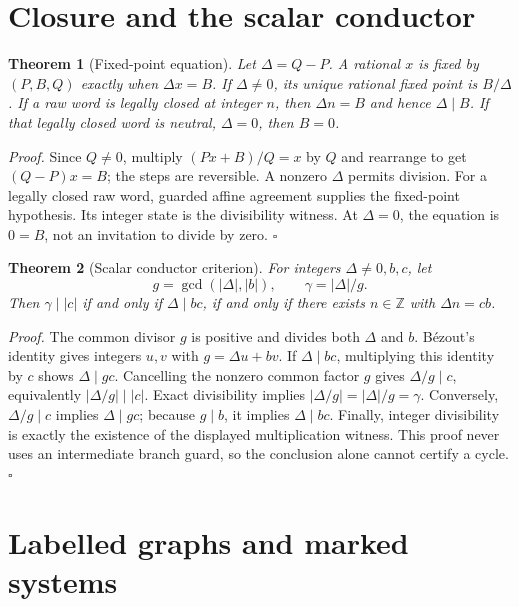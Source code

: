 \documentclass[11pt,letterpaper]{article}
\newcommand{\Z}{\mathbb{Z}}
\newtheorem{theorem}{Theorem}
\newenvironment{proof}{\noindent\textit{Proof.}}{\hfill\(\square\)}
\begin{document}
\section{Closure and the scalar conductor}

\begin{theorem}[Fixed-point equation]
Let \(\Delta=Q-P\). A rational \(x\) is fixed by \((P,B,Q)\) exactly when
\(\Delta x=B\). If \(\Delta\ne0\), its unique rational fixed point is
\(B/\Delta\). If a raw word is legally closed at integer \(n\), then
\(\Delta n=B\) and hence \(\Delta\mid B\). If that legally closed word is
neutral, \(\Delta=0\), then \(B=0\).
\end{theorem}
\begin{proof}
Since \(Q\ne0\), multiply \((Px+B)/Q=x\) by \(Q\) and rearrange to get
\((Q-P)x=B\); the steps are reversible. A nonzero \(\Delta\) permits division.
For a legally closed raw word, guarded affine agreement supplies the fixed-point
hypothesis. Its integer state is the divisibility witness. At \(\Delta=0\),
the equation is \(0=B\), not an invitation to divide by zero.
\end{proof}

\begin{theorem}[Scalar conductor criterion]
For integers \(\Delta\ne0,b,c\), let
\[
g=\gcd(|\Delta|,|b|),\qquad \gamma=|\Delta|/g.
\]
Then \(\gamma\mid |c|\) if and only if \(\Delta\mid bc\), if and only if there
exists \(n\in\Z\) with \(\Delta n=cb\).
\end{theorem}
\begin{proof}
The common divisor \(g\) is positive and divides both \(\Delta\) and \(b\).
B\'ezout's identity \cite{Lang02} gives integers \(u,v\) with \(g=\Delta u+bv\).
If \(\Delta\mid bc\), multiplying this identity by \(c\) shows
\(\Delta\mid gc\). Cancelling the nonzero common factor \(g\) gives
\(\Delta/g\mid c\), equivalently \(|\Delta/g|\mid |c|\).
Exact divisibility implies \(|\Delta/g|=|\Delta|/g=\gamma\).
Conversely, \(\Delta/g\mid c\) implies \(\Delta\mid gc\); because \(g\mid b\),
it implies \(\Delta\mid bc\). Finally, integer divisibility is exactly the
existence of the displayed multiplication witness. This proof never uses an
intermediate branch guard, so the conclusion alone cannot certify a cycle.
\end{proof}

\section{Labelled graphs and marked systems}
\end{document}
